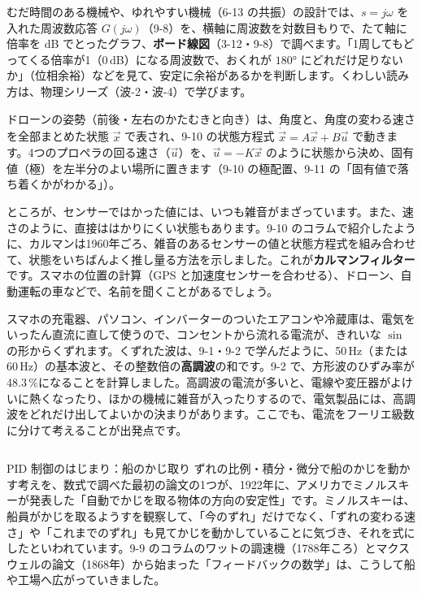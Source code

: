 むだ時間のある機械や、ゆれやすい機械（6-13 の共振）の設計では、$s=j\omega$ を入れた周波数応答 $G(j\omega)$（9-8）を、横軸に周波数を対数目もりで、たて軸に倍率を dB でとったグラフ、\textbf{ボード線図}（3-12・9-8）で調べます。「1周してもどってくる倍率が1（0\,dB）になる周波数で、おくれが $180°$ にどれだけ足りないか」（位相余裕）などを見て、安定に余裕があるかを判断します。くわしい読み方は、物理シリーズ（波-2・波-4）で学びます。


\label{bk:9-12:drone}ドローンの姿勢（前後・左右のかたむきと向き）は、角度と、角度の変わる速さを全部まとめた状態 $\vec x$ で表され、9-10 の状態方程式 $\dot{\vec x}=A\vec x+B\vec u$ で動きます。4つのプロペラの回る速さ（$\vec u$）を、$\vec u=-K\vec x$ のように状態から決め、固有値（極）を左半分のよい場所に置きます（9-10 の極配置、9-11 の「固有値で落ち着くかがわかる」）。

ところが、センサーではかった値には、いつも雑音がまざっています。また、速さのように、直接ははかりにくい状態もあります。9-10 のコラムで紹介したように、カルマンは1960年ごろ、雑音のあるセンサーの値と状態方程式を組み合わせて、状態をいちばんよく推し量る方法を示しました。これが\textbf{カルマンフィルター}です。スマホの位置の計算（GPS と加速度センサーを合わせる）、ドローン、自動運転の車などで、名前を聞くことがあるでしょう。



\label{bk:9-12:koucho}スマホの充電器、パソコン、インバーターのついたエアコンや冷蔵庫は、電気をいったん直流に直して使うので、コンセントから流れる電流が、きれいな $\sin$ の形からくずれます。くずれた波は、9-1・9-2 で学んだように、50\,Hz（または60\,Hz）の基本波と、その整数倍の\textbf{高調波}の和です。9-2 で、方形波のひずみ率が48.3\,\%になることを計算しました。高調波の電流が多いと、電線や変圧器がよけいに熱くなったり、ほかの機械に雑音が入ったりするので、電気製品には、高調波をどれだけ出してよいかの決まりがあります。ここでも、電流をフーリエ級数に分けて考えることが出発点です。

\begin{column}{PID 制御のはじまり：船のかじ取り}
ずれの比例・積分・微分で船のかじを動かす考えを、数式で調べた最初の論文の1つが、1922年に、アメリカでミノルスキーが発表した「自動でかじを取る物体の方向の安定性」です。ミノルスキーは、船員がかじを取るようすを観察して、「今のずれ」だけでなく、「ずれの変わる速さ」や「これまでのずれ」も見てかじを動かしていることに気づき、それを式にしたといわれています。9-9 のコラムのワットの調速機（1788年ころ）とマクスウェルの論文（1868年）から始まった「フィードバックの数学」は、こうして船や工場へ広がっていきました。
\end{column}

